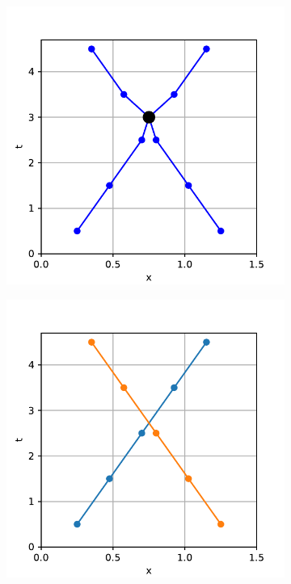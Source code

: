 \documentclass[12pt]{article}
\theoremstyle{definition}
\begin{document}
\begin{figure}
    \centering
    \begin{subfigure}[t]{0.3\textwidth}
      \includegraphics[width=\textwidth]{u-turn-graph.pdf}
      \caption{}
      \label{fig:u-turn-graph}
    \end{subfigure}
    \begin{subfigure}[t]{0.3\textwidth}
      \includegraphics[width=\textwidth]{u-turn-a.pdf}

\end{subfigure}
\end{figure}
\end{document}
